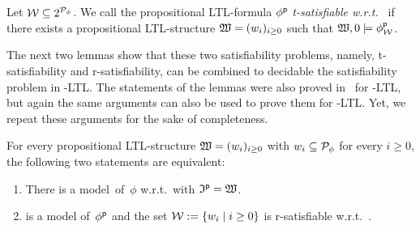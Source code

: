 \begin{definition}[T-satisfiability]\label{def:t-sat}
    Let $\mathcal{W}\subseteq 2^{\mathcal{P}_\phi}$.  We call the propositional LTL-formula
    $\phi^\mathsf{p}$ \emph{t-satisfiable w.r.t.~\Wmc} if there exists a propositional
    LTL-structure $\mathfrak{W}=(w_i)_{i\ge 0}$ such that $\mathfrak{W},0\models\phi^\mathsf{p}_\mathcal{W}$.
\end{definition}

\noindent
The next two lemmas show that these two satisfiability problems, namely,
t-satisfiability and r-satisfiability, can be combined to decidable the
satisfiability problem in \SHOQ-LTL\@.  The statements of the lemmas were also
proved in~\cite{BaGL-ToCL12} for \ALC-LTL, but again the same arguments can also
be used to prove them for \SHOQ-LTL\@.  Yet, we repeat these arguments for the
sake of completeness.

\begin{lemma}\label{lem:ltl-structure-r-sat}
    For every propositional LTL-structure $\mathfrak{W}=(w_i)_{i\ge 0}$ with
    $w_i\subseteq\mathcal{P}_\phi$ for every $i\ge 0$, the following two statements are
    equivalent:
    \begin{enumerate}
        \item There is a model~\Imf of~$\phi$ w.r.t.~\Rmc with $\mathfrak{I}^\mathsf{p}=\mathfrak{W}$.
        \item \Wmf is a model of~$\phi^\mathsf{p}$ and the set
            $\mathcal{W}:=\{w_i\mid i\ge 0\}$ is r-satisfiable w.r.t.~\Rmc.
    \end{enumerate}
\end{lemma}

